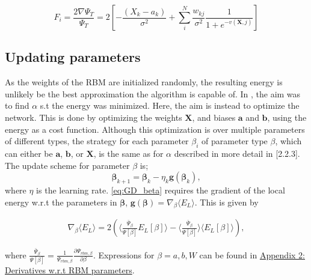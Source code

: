 \documentclass[%
oneside,                 %
final,                   %
10pt]{article}
\begin{document}
\begin{equation}
F_i = \frac{2\nabla \Psi_T}{\Psi_T} = 2 \left[- \frac{(X_k - a_k)}{\sigma^2} + \sum_{i}^N \frac{w_{kj}}{\sigma^2}\frac{1}{1 + e^{-v(\bm X,j)}} \right]
\end{equation} 

\subsection{Updating parameters}
As the weights of the RBM are initialized randomly, the resulting energy is unlikely be the best approximation the algorithm is capable of. In \cite{JN_P1}, the aim was to find $\alpha$ s.t the energy was minimized. Here, the aim is instead to optimize the network.  This is done by optimizing the weights $\bm X$, and biases $\bm a$ and $\bm b$, using the energy as a cost function. Although this optimization is over multiple parameters of different types, the strategy for each parameter $\beta_i$ of parameter type $\beta$, which can either be $\bm a$, $\bm b$, or $\bm X$, is the same as for $\alpha$ described in more detail in \cite{JN_P1}[2.2.3]. The update scheme for parameter $\beta$ is;
\begin{equation}
\bm{\beta}_{k+1}=\bm{\beta}_{k}-\eta_k  \bm g (\bm{\beta}_k),
\label{eq:GD_beta}
\end{equation}
where $\eta$ is the learning rate. \eqref{eq:GD_beta} requires the gradient of the local energy w.r.t the parameters in $\bm \beta$, $\bm g (\bm \beta)=\nabla_{\beta} \langle E_L \rangle$. This is given by

\begin{align*}
\nabla_{\beta} \langle E_L \rangle = 2 \left( \langle \frac{\bar \Psi_{\beta}}{\Psi [\beta]} E_L[\beta] \rangle - \langle \frac{\bar \Psi_{\beta}}{\Psi [\beta]} \rangle \langle E_L[\beta] \rangle  \right),
\end{align*}

where $\frac{\bar \Psi_{\beta}}{\Psi [\beta]} = \frac{1}{\Psi_{rbm,\beta} } \frac{\partial \Psi_{rbm,\beta}}{\partial \beta}$. Expressions for $\beta = a,b,W$ can be found in \hyperref[APP_2]{Appendix 2: Derivatives w.r.t RBM parameters}.
\end{document}
